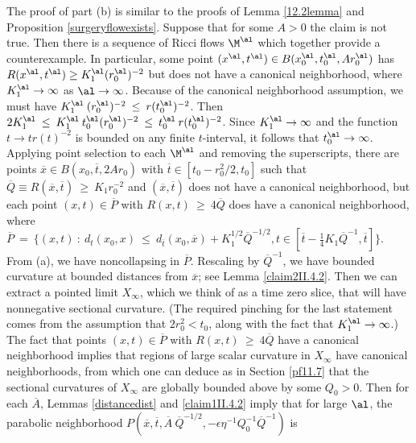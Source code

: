 The proof of part (b)
is similar to the proofs of
Lemma \ref{12.2lemma}
and Proposition \ref{surgeryflowexists}.
Suppose that for some $A > 0$ the claim is not true. Then there
is a sequence of Ricci flows $\M^\al$ which together provide a
counterexample.  In particular, some point $(x^\al, t^\al) \in
B(x_0^\al, t_0^\al, A r_0^\al)$ has $R(x^\al, t^\al) \ge K_1^\al
(r_0^\al)^{-2}$ but does not have a canonical neighborhood, where
$K_1^\al \rightarrow \infty$ as $\al \rightarrow \infty$.
Because of the canonical neighborhood
assumption, we must have $K_1^\al \: (r_0^{\al})^{-2} \: \le \:
r(t_0^{\al})^{-2}$.
Then $2 K_1^{\al} \: \le \: K_1^{\al} \: t_0^{\al} (r_0^{\al})^{-2}
\: \le \: t_0^{\al} \: r(t_0^{\al})^{-2}$. Since $K_1^{\al}
\rightarrow \infty$ and
the function $t \rightarrow t r(t)^{-2}$ is bounded on any finite
$t$-interval, it follows that $t_0^\al \rightarrow \infty$.
Applying point selection to each
$\M^\al$ and removing the superscripts, there are points
$\overline{x} \in B(x_0, \overline{t}, 2Ar_0)$ with
$\overline{t} \in [t_0 - r_0^2/2, t_0]$ such that
$\overline{Q} \equiv R(\overline{x}, \overline{t}) \: \ge \:
K_1 r_0^{-2}$ and $(\overline{x}, \overline{t})$ does not have a
canonical neighborhood, but each point $(x, t) \in \overline{P}$
with $R(x, t) \: \ge \: 4 \overline{Q}$ does have a canonical
neighborhood, where $\overline{P} \: = \:
\{(x, t) \: : \: d_t(x_0, x) \: \le \: d_{\overline{t}}(x_0,
\overline{x}) + K_1^{1/2} \overline{Q}^{-1/2}, t \in
[\overline{t} - \frac14 K_1 \overline{Q}^{-1}, \overline{t}]\}$.
From (a), we have noncollapsing in $\overline{P}$. Rescaling by
$\overline{Q}^{-1}$, we have bounded curvature at bounded distances
from $\overline{x}$; see Lemma \ref{claim2II.4.2}.
Then we can extract a pointed limit $X_\infty$, which we think of as
a time zero slice, that
will have nonnegative sectional curvature.
(The required pinching for the last statement comes from the assumption that
$2r_0^2 < t_0$, along with the fact that $K_1^\al \rightarrow \infty$.)
The fact that
points $(x, t) \in \overline{P}$
with $R(x, t) \: \ge \: 4 \overline{Q}$ have a canonical
neighborhood implies that regions of large scalar curvature in $X_\infty$
have canonical neighborhoods, from which one can
deduce as in Section \ref{pf11.7} that
the sectional curvatures of $X_\infty$ are globally bounded above
by some $Q_0 > 0$.
Then for each $\overline{A}$,
Lemmas \ref{distancedist} and \ref{claim1II.4.2}
imply that for large $\al$, the parabolic neighborhood
$P(\overline{x}, \overline{t}, \overline{A} \: \overline{Q}^{-1/2},
- \epsilon \eta^{-1} Q_0^{-1} \overline{Q}^{-1})$ is
